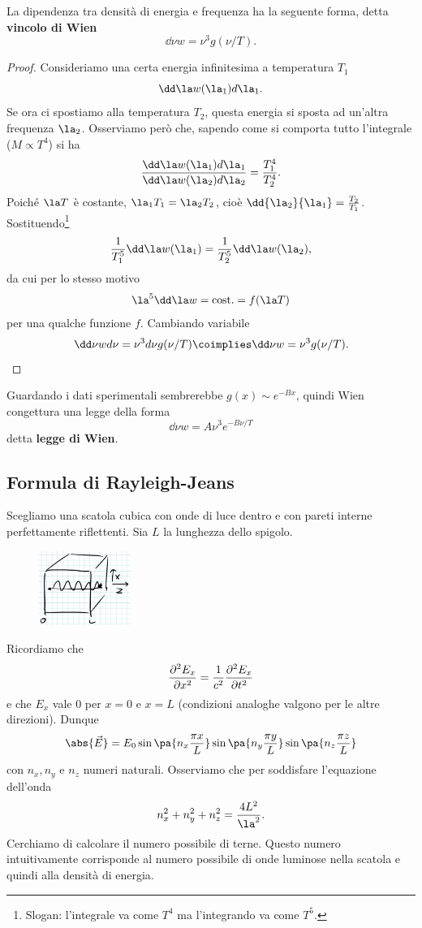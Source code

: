 \begin{proposition}\label{VincoloWien}
La dipendenza tra densit\`a di energia e frequenza ha la seguente forma, detta \textbf{vincolo di Wien}
\[\dd \nu w=\nu^3 g(\nu/T).\]
\end{proposition}
\begin{proof}
Consideriamo una certa energia infinitesima a temperatura $T_1$
\[\dd \la w(\la_1)d\la_1.\]
Se ora ci spostiamo alla temperatura $T_2$, questa energia si sposta ad un'altra frequenza $\la_2$. Osserviamo per\`o che, sapendo come si comporta tutto l'integrale ($M\propto T^4$) si ha
\[\frac{\dd \la w(\la_1)d\la_1}{\dd \la w(\la_2)d\la_2}=\frac{T^4_1}{T^4_2}.\]
Poich\'e $\la T$ \`e costante, $\la_1T_1=\la_2T_2$, cio\`e $\dd{\la_2}{\la_1}=\frac{T_2}{T_1}$. Sostituendo\footnote{Slogan: l'integrale va come $T^4$ ma l'integrando va come $T^5$.}
\[\frac1{T_1^5}\dd \la w(\la_1)=\frac1{T_2^5}\dd \la w(\la_2),\]
da cui per lo stesso motivo
\[\la^5\dd \la w=\text{cost.}=f(\la T)\]
per una qualche funzione $f$. Cambiando variabile
\[\dd \nu wd\nu=\nu^3d\nu g(\nu/T)\coimplies \dd \nu w=\nu^3 g(\nu/T).\]
\end{proof}

\noindent
Guardando i dati sperimentali sembrerebbe $g(x)\sim e^{-Bx}$, quindi Wien congettura una legge della forma
\[\dd \nu w=A\nu^3e^{-B\nu/T}\]
detta \textbf{legge di Wien}.




\subsection{Formula di Rayleigh-Jeans}
Scegliamo una scatola cubica con onde di luce dentro e con pareti interne perfettamente riflettenti. Sia $L$ la lunghezza dello spigolo.

\begin{figure}[!htb]
    \centering
    \includegraphics[width=3cm]{images/raggio_dentro_scatola.png}
\end{figure}


\noindent
Ricordiamo che
\[\pps[2]x{E_x}=\frac1{c^2}\pps[2]t{E_x}\]
e che $E_x$ vale $0$ per $x=0$ e $x=L$ (condizioni analoghe valgono per le altre direzioni). Dunque
\[\abs{\vec E}=E_0\sin\pa{n_x\frac{\pi x}L}\sin\pa{n_y\frac{\pi y}L}\sin\pa{n_z\frac{\pi z}L}\]
con $n_x,n_y$ e $n_z$ numeri naturali. Osserviamo che per soddisfare l'equazione dell'onda
\[n_x^2+n_y^2+n_z^2=\frac{4L^2}{\la^2}.\]
Cerchiamo di calcolare il numero possibile di terne. Questo numero intuitivamente corrisponde al numero possibile di onde luminose nella scatola e quindi alla densit\`a di energia.


